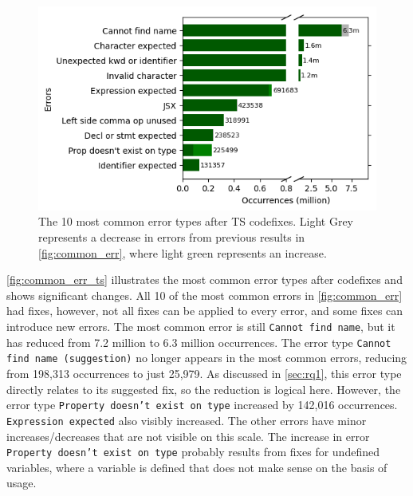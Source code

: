 \documentclass[conference]{IEEEtran}
\begin{document}
\begin{figure}[h]
    \centering
    \includegraphics[width=0.8\linewidth]{images/commonErrorTypesTS.png}
    \caption{The 10 most common error types after TS codefixes. Light Grey represents a decrease in errors from previous results in \autoref{fig:common_err}, where light green represents an increase.}
    \label{fig:common_err_ts}
\end{figure}

\autoref{fig:common_err_ts} illustrates the most common error types after codefixes and shows significant changes. All 10 of the most common errors in \autoref{fig:common_err} had fixes, however, not all fixes can be applied to every error, and some fixes can introduce new errors. The most common error is still \texttt{Cannot find name}, but it has reduced from 7.2 million to 6.3 million occurrences. The error type \texttt{Cannot find name (suggestion)} no longer appears in the most common errors, reducing from 198,313 occurrences to just 25,979. As discussed in \autoref{sec:rq1}, this error type directly relates to its suggested fix, so the reduction is logical here. However, the error type \texttt{Property doesn't exist on type} increased by 142,016 occurrences. \texttt{Expression expected} also visibly increased. The other errors have minor increases/decreases that are not visible on this scale. The increase in error \texttt{Property doesn't exist on type} probably results from fixes for undefined variables, where a variable is defined that does not make sense on the basis of usage.



\end{document}
